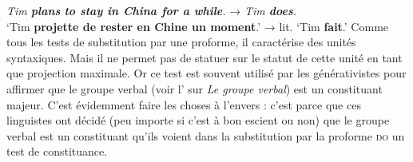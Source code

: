 {    \ea
        \textit{{Tim} \textbf{{plans}} \textbf{{to stay in China for a while}}.}     \textrm{→}   \textit{{Tim} \textbf{{does}}.}\\
        \glt   ‘Tim \textbf{projette de rester en Chine un moment}.’  \textrm{→}   lit. ‘Tim \textbf{fait}.’
    \z
    Comme tous les tests de substitution par une proforme, il caractérise des unités syntaxiques. Mais il ne permet pas de statuer sur le statut de cette unité en tant que projection maximale. Or ce test est souvent utilisé par les générativistes pour affirmer que le groupe verbal (voir l’ sur \textit{Le groupe verbal}) est un constituant majeur. C’est évidemment faire les choses à l’envers : c’est parce que ces linguistes ont décidé (peu importe si c’est à bon escient ou non) que le groupe verbal est un constituant qu’ils voient dans la substitution par la proforme \textsc{do} un test de constituance.
}
\largerpage
